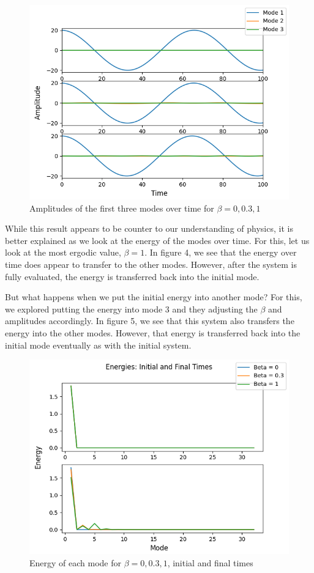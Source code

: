 \documentclass[pra,twocolumn,showpacs,amsmath,amssymb]{revtex4-2}
\begin{document}
\begin{figure}[t!]
\includegraphics[scale=0.50]{Amp_Betas.png}
\caption{Amplitudes of the first three modes over time for $\beta = 0, 0.3, 1$}\label{Poincare0.5}
\end{figure}

\par While this result appears to be counter to our understanding of physics, it is better explained as we look at the energy of the modes over time. For this, let us look at the most ergodic value, $\beta = 1$. In figure 4, we see that the energy over time does appear to transfer to the other modes. However, after the system is fully evaluated, the energy is transferred back into the initial mode.
\par But what happens when we put the initial energy into another mode? For this, we explored putting the energy into mode 3 and they adjusting the $\beta$ and amplitudes accordingly. In figure 5, we see that this system also transfers the energy into the other modes. However, that energy is transferred back into the initial mode eventually as with the initial system.

\begin{figure}[t!]
\includegraphics[scale=0.50]{Ene_Betas.png}
\caption{Energy of each mode for $\beta = 0, 0.3, 1$, initial and final times}\label{Poincare9}
\end{figure}
\end{document}
